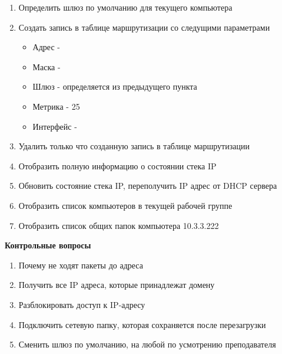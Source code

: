 \documentclass[a4paper,12pt]{article}
\begin{document}
\begin{flushleft}
\begin{enumerate} [1. ]
\begin{enumerate} [\bf a. ]
        \item Определить шлюз по умолчанию для текущего компьютера
        \item Создать запись в таблице маршрутизации со следущими параметрами
          \begin{itemize}
           \item Адрес - 
           \item Маска - 
           \item Шлюз - определяется из предыдущего пункта
           \item Метрика - 25
           \item Интерфейс - 
          \end{itemize}
        \item Удалить только что созданную запись в таблице маршрутизации

        \item Отобразить полную информацию о состоянии стека IP
        \item Обновить состояние стека IP, переполучить IP адрес от DHCP сервера
        \item Отобразить список компьютеров в текущей рабочей группе
        \item Отобразить список общих папок компьютера 10.3.3.222

        \end{enumerate}
    \end{enumerate}

  \end{flushleft}

  \begin{center}
   {\bf Контрольные вопросы}
  \end{center}
  \begin{flushleft}
    \begin{enumerate}
     \item Почему не ходят пакеты до адреса 
     \item Получить все IP адреса, которые принадлежат домену 
     \item Разблокировать доступ к IP-адресу 
     \item Подключить сетевую папку, которая сохраняется после перезагрузки
     \item Сменить шлюз по умолчанию, на любой по усмотрению преподавателя

    \end{enumerate}

  \end{flushleft}
\end{document}

